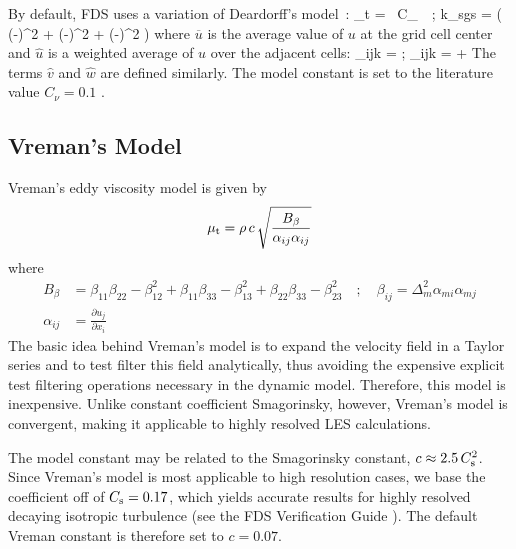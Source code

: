 By default, FDS uses a variation of Deardorff's model~\cite{Deardorff:1}:
\be
  \mu_{\rm t} = \rho \, C_\nu \, \Delta \,  \quad ; \quad
  k_{\rm sgs} = \ha \left( (-)^2 + (-)^2 + (-)^2 \right)  \label{Deardorff_LES}
\ee
where $\overline{u}$ is the average value of $u$ at the grid cell center and $\hat{u}$ is a weighted average of $u$ over the adjacent cells:
\be
   _{ijk} =  \quad ; \quad {}_{ijk} =  + 
\ee
The terms $\hat{v}$ and $\hat{w}$ are defined similarly.  The model constant is set to the literature value $C_\nu=0.1$ \cite{Pope:2000}.

\subsection{Vreman's Model}
\label{sec:vreman}

Vreman's eddy viscosity model \cite{vreman:2004} is given by
\begin{equation}
\label{eqn_mu_vreman}
\mu_{\rm t} = \rho \, c \, \sqrt{ \frac{B_\beta}{\alpha_{ij}\alpha_{ij}} }
\end{equation}
where
\begin{align}
B_\beta     &= \beta_{11}\beta_{22} - \beta_{12}^2 + \beta_{11}\beta_{33} - \beta_{13}^2 + \beta_{22}\beta_{33} - \beta_{23}^2 \quad ; \quad \beta_{ij} = \Delta_m^2 \alpha_{mi} \alpha_{mj} \\
\alpha_{ij} &= \frac{\partial u_j}{\partial x_i}
\end{align}
The basic idea behind Vreman's model is to expand the velocity field in a Taylor series and to test filter this field analytically, thus avoiding the expensive explicit test filtering operations necessary in the dynamic model.  Therefore, this model is inexpensive.  Unlike constant coefficient Smagorinsky, however, Vreman's model is convergent, making it applicable to highly resolved LES calculations.

The model constant may be related to the Smagorinsky constant, $c \approx 2.5 \, C_{\rm s}^2$.  Since Vreman's model is most applicable to high resolution cases, we base the coefficient off of $C_{\rm s} = 0.17$, which yields accurate results for highly resolved decaying isotropic turbulence (see the FDS Verification Guide \cite{FDS_Verification_Guide}).  The default Vreman constant is therefore set to $c = 0.07$.

